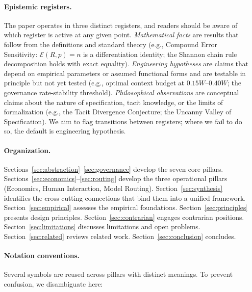 \documentclass[11pt, a4paper]{googledeepmind}
\begin{document}
\paragraph{Epistemic registers.} The paper operates in three distinct registers, and readers should be aware of which register is active at any given point. \emph{Mathematical facts} are results that follow from the definitions and standard theory (e.g., Compound Error Sensitivity: $\mathcal{E}(R,p) = n$ is a differentiation identity; the Shannon chain rule decomposition holds with exact equality). \emph{Engineering hypotheses} are claims that depend on empirical parameters or assumed functional forms and are testable in principle but not yet tested (e.g., optimal context budget at $0.15W$--$0.40W$; the governance rate-stability threshold). \emph{Philosophical observations} are conceptual claims about the nature of specification, tacit knowledge, or the limits of formalization (e.g., the Tacit Divergence Conjecture; the Uncanny Valley of Specification). We aim to flag transitions between registers; where we fail to do so, the default is engineering hypothesis.

\paragraph{Organization.} Sections~\ref{sec:abstraction}--\ref{sec:governance} develop the seven core pillars. Sections~\ref{sec:economics}--\ref{sec:routing} develop the three operational pillars (Economics, Human Interaction, Model Routing). Section~\ref{sec:synthesis} identifies the cross-cutting connections that bind them into a unified framework. Section~\ref{sec:empirical} assesses the empirical foundations. Section~\ref{sec:principles} presents design principles. Section~\ref{sec:contrarian} engages contrarian positions. Section~\ref{sec:limitations} discusses limitations and open problems. Section~\ref{sec:related} reviews related work. Section~\ref{sec:conclusion} concludes.

\paragraph{Notation conventions.} Several symbols are reused across pillars with distinct meanings. To prevent confusion, we disambiguate here:
\end{document}

